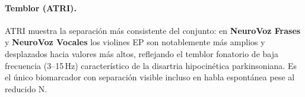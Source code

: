 \paragraph{Temblor (ATRI).} ATRI muestra la separación más consistente del conjunto: en \textbf{NeuroVoz Frases} y \textbf{NeuroVoz Vocales} los violines EP son notablemente más amplios y desplazados hacia valores más altos, reflejando el temblor fonatorio de baja frecuencia (3--15\,Hz) característico de la disartria hipocinética parkinsoniana. Es el único biomarcador con separación visible incluso en habla espontánea pese al reducido N.
